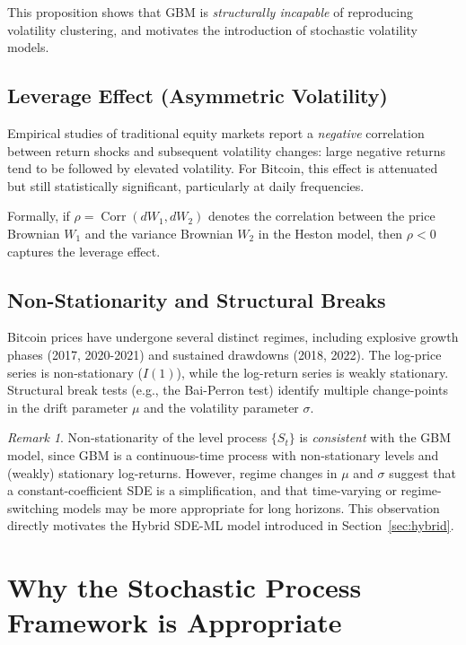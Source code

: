 \documentclass[12pt, a4paper, oneside]{report}
\theoremstyle{plain}
\theoremstyle{definition}
\theoremstyle{remark}
\newtheorem{remark}[theorem]{Remark}
\begin{document}
This proposition shows that GBM is \emph{structurally incapable} of reproducing
volatility clustering, and motivates the introduction of stochastic volatility models.

\subsection{Leverage Effect (Asymmetric Volatility)}

Empirical studies of traditional equity markets report a \emph{negative} correlation
between return shocks and subsequent volatility changes: large negative returns tend
to be followed by elevated volatility.  For Bitcoin, this effect is attenuated but
still statistically significant, particularly at daily frequencies.

Formally, if $\rho = \operatorname{Corr}(dW_1, dW_2)$ denotes the correlation between
the price Brownian $W_1$ and the variance Brownian $W_2$ in the Heston model, then
$\rho < 0$ captures the leverage effect.

\subsection{Non-Stationarity and Structural Breaks}

Bitcoin prices have undergone several distinct regimes, including explosive growth
phases (2017, 2020-2021) and sustained drawdowns (2018, 2022).  The log-price
series is non-stationary ($I(1)$), while the log-return series is weakly stationary.
Structural break tests (e.g., the Bai-Perron test) identify multiple change-points
in the drift parameter $\mu$ and the volatility parameter $\sigma$.

\begin{remark}
Non-stationarity of the level process $\{S_t\}$ is \emph{consistent} with the GBM
model, since GBM is a continuous-time process with non-stationary levels and (weakly)
stationary log-returns.  However, regime changes in $\mu$ and $\sigma$ suggest that
a constant-coefficient SDE is a simplification, and that time-varying or
regime-switching models may be more appropriate for long horizons.  This observation
directly motivates the Hybrid SDE-ML model introduced in Section~\ref{sec:hybrid}.
\end{remark}

\section{Why the Stochastic Process Framework is Appropriate}
\end{document}
